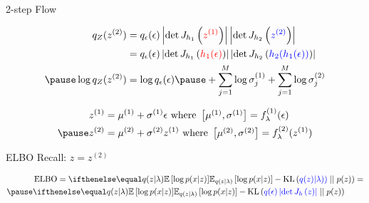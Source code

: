 \documentclass[14pt]{beamer}
\begin{document}
\begin{frame}{2-step Flow}
\begin{small}
\begin{equation*}
\begin{aligned}
q_{Z}(z^{(2)}) &= q_{\epsilon}(\epsilon)\djac{h_{1}}{\textcolor{red}{z^{(1)}}}\djac{h_{2}}{\textcolor{blue}{z^{(2)}}} \\
&= q_{\epsilon}(\epsilon)\djac{h_{1}}{\textcolor{red}{h_{1}(\epsilon)}}\djac{h_{2}}{\textcolor{blue}{h_{2}(h_{1}(\epsilon))}} \\ \pause
\log q_{Z}(z^{(2)}) &= \log q_{\epsilon}(\epsilon) \pause + \sum_{j=1}^{M}\log\sigma^{(1)}_{j} + \sum_{j=1}^{M}\log\sigma^{(2)}_{j}
\end{aligned}
\end{equation*}
\end{small}
\pause
\begin{equation*}
\begin{aligned}
z^{(1)} &= \mu^{(1)} + \sigma^{(1)}\epsilon \text{ where } \begin{bmatrix}\mu^{(1)}, \sigma^{(1)}\end{bmatrix} = f^{(1)}_{\lambda}(\epsilon) \\ \pause
z^{(2)} &= \mu^{(2)} + \sigma^{(2)}z^{(1)} \text{ where } \begin{bmatrix}\mu^{(2)}, \sigma^{(2)}\end{bmatrix} = f^{(2)}_{\lambda}(z^{(1)})
\end{aligned}
\end{equation*}
\end{frame}

\begin{frame}{ELBO}
Recall: $ z = z^{(2)} $
\begin{small}
\begin{equation*}
\begin{aligned}
&\ELBO = \E[q(z|\lambda)]{\log p(x|z)} - \KL{\textcolor{blue}{q(z)|\lambda))}}{p(z)} = \\ \pause
&\E[q(z|\lambda)]{\log p(x|z)} - \KL{\textcolor{blue}{q(\epsilon)\djac{h}{z}}}{p(z)}
\end{aligned}
\end{equation*}
\end{small}
\end{frame}
\end{document}
